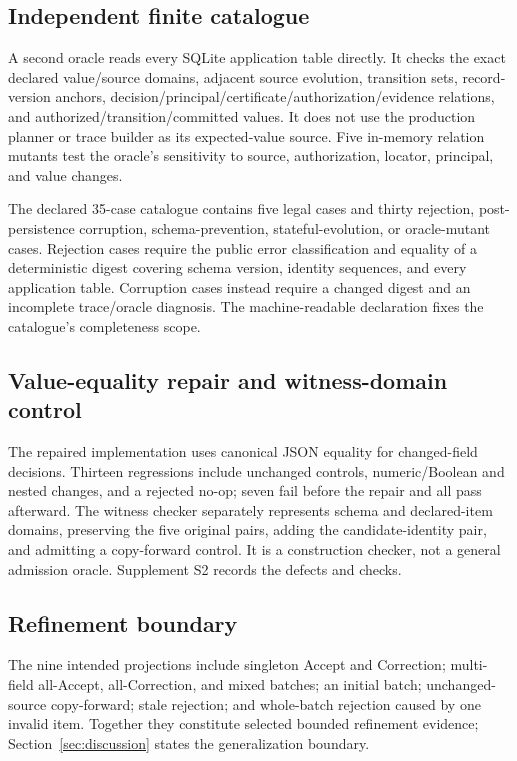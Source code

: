 \subsection{Independent finite catalogue}

A second oracle reads every SQLite application table directly. It checks the exact declared value/source domains, adjacent source evolution, transition sets, record-version anchors, decision/principal/certificate/authorization/evidence relations, and authorized/transition/committed values. It does not use the production planner or trace builder as its expected-value source. Five in-memory relation mutants test the oracle's sensitivity to source, authorization, locator, principal, and value changes.

The declared 35-case catalogue contains five legal cases and thirty rejection, post-persistence corruption, schema-prevention, stateful-evolution, or oracle-mutant cases. Rejection cases require the public error classification and equality of a deterministic digest covering schema version, identity sequences, and every application table. Corruption cases instead require a changed digest and an incomplete trace/oracle diagnosis. The machine-readable declaration fixes the catalogue's completeness scope.

\subsection{Value-equality repair and witness-domain control}

The repaired implementation uses canonical JSON equality for changed-field decisions. Thirteen regressions include unchanged controls, numeric/Boolean and nested changes, and a rejected no-op; seven fail before the repair and all pass afterward. The witness checker separately represents schema and declared-item domains, preserving the five original pairs, adding the candidate-identity pair, and admitting a copy-forward control. It is a construction checker, not a general admission oracle. Supplement S2 records the defects and checks.

\subsection{Refinement boundary}

The nine intended projections include singleton Accept and Correction; multi-field all-Accept, all-Correction, and mixed batches; an initial batch; unchanged-source copy-forward; stale rejection; and whole-batch rejection caused by one invalid item. Together they constitute selected bounded refinement evidence; Section~\ref{sec:discussion} states the generalization boundary.

